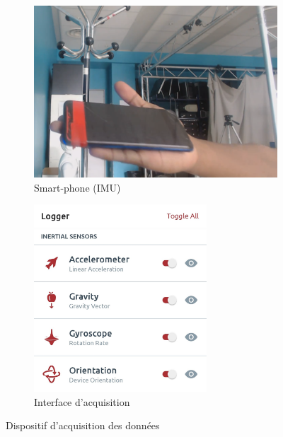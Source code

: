 \documentclass[8pt]{article}
\begin{document}
\begin{figure}[H]
    \begin{subfigure}{0.5\textwidth}
        \centering
        \includegraphics[width=\linewidth]{../phone.png}
        \caption{Smart-phone (IMU)}
        \label{subfig:phone}
    \end{subfigure}
    \begin{subfigure}{0.5\textwidth}
        \centering
        \includegraphics[width=\linewidth, height=7cm]{../apkk.jpg}
        \caption{Interface d'acquisition}
        \label{subfig:apk}
    \end{subfigure}
    \caption{Dispositif d'acquisition des données}
    \label{fig:data}
\end{figure}
\end{document}

